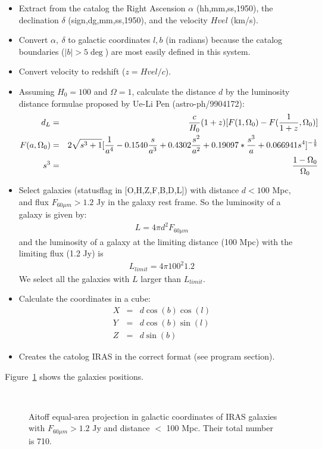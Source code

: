 \begin{itemize}
\item Extract from the catalog the Right Ascension $\alpha$ (hh,mm,ss,1950), 
the declination $\delta$ (sign,dg,mm,ss,1950), and the velocity $Hvel$ (km/s).
\item Convert $\alpha,\ \delta$ to galactic coordinates $l,b$ (in radians)
  because the catalog boundaries ($|b| > 5 \deg$) are most easily
  defined in this system.
\item Convert velocity to redshift ($z= Hvel/c$).
\item Assuming $H_0=100$ and $\Omega=1$, calculate the distance $d$ by the
luminosity distance formulae proposed by Ue-Li Pen (astro-ph/9904172):
\begin{eqnarray}
d_L & = & {c \over H_0}(1+z) [ F(1,\Omega_0) - F({1 \over 1 + z}, \Omega_0)] \nonumber  \\
F(a,\Omega_0) & = & 2 \sqrt{s^3+1} 
[ {1 \over a^4} - 0.1540 {s \over a^3} + 0.4302 {s^2 \over  a^2} +  
        0.19097*{s^3 \over a} + 0.066941 s^4 ]^{-{1\over 8}}  \nonumber  \\
 s^3 & = & {1 - \Omega_0 \over \Omega_0 }
\end{eqnarray}
\item Select galaxies (statusflag in [O,H,Z,F,B,D,L]) with 
distance $ d < 100$ Mpc, and flux $F_{60\mu m} > 1.2$ Jy in the galaxy rest
frame. So the luminosity of a galaxy is given by:
\begin{eqnarray}
  L = 4\pi d^2 F_{60\mu m} 
  \end{eqnarray}
  and the luminosity of a galaxy at the limiting distance (100 Mpc)
  with the limiting flux (1.2 Jy) is
  \begin{eqnarray}
  L_{limit} = 4\pi 100^2 1.2 
  \end{eqnarray}
  We select all the galaxies with $L$ larger than $L_{limit}$.
\item Calculate the coordinates in a cube:
\begin{eqnarray}
 X  & = & d \cos(b) \cos(l) \nonumber \\
 Y  & = & d \cos(b) \sin(l) \nonumber \\
 Z  & = & d \sin(b)
\end{eqnarray}
\item Creates the catolog IRAS in the correct format (see program section).
\end{itemize}


Figure~\ref{fig_iras} shows the galaxies positions.
\begin{figure}[htb]
\centerline{
\hbox{
}}
\caption{Aitoff equal-area projection in galactic coordinates of 
  IRAS galaxies with $F_{60\mu m} > 1.2$ Jy and distance $<$
  100 Mpc. Their total number is 710.}
\label{fig_iras}
\end{figure}

